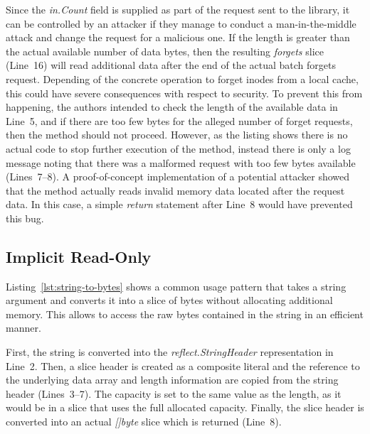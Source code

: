 Since the \textit{in.Count} field is supplied as part of the request sent to the library, it can be controlled by an
attacker if they manage to conduct a man-in-the-middle attack and change the request for a malicious
one.
If the length is greater than the actual available number of data bytes, then the resulting \textit{forgets} slice
(Line~16) will read additional data after the end of the actual batch forgets request.
Depending of the concrete operation to forget inodes from a local cache, this could have severe consequences with
respect to security.
To prevent this from happening, the authors intended to check the length of the available data in Line~5, and if there
are too few bytes for the alleged number of forget requests, then the method should not proceed.
However, as the listing shows there is no actual code to stop further execution of the method, instead there is only a
log message noting that there was a malformed request with too few bytes available (Lines~7--8).
A proof-of-concept implementation of a potential attacker showed that the method actually reads invalid memory data
located after the request data.
In this case, a simple \textit{return} statement after Line~8 would have prevented this bug.



\subsection{Implicit Read-Only}\label{subsec:unsafe-security-problems:slice-casts:read-only}

Listing~\ref{lst:string-to-bytes} shows a common \unsafe{} usage pattern that takes a string argument and converts it
into a slice of bytes without allocating additional memory.
This allows to access the raw bytes contained in the string in an efficient manner.



First, the string is converted into the \textit{reflect.StringHeader} representation in Line~2.
Then, a slice header is created as a composite literal and the reference to the underlying data array and length
information are copied from the string header (Lines~3--7).
The capacity is set to the same value as the length, as it would be in a slice that uses the full allocated capacity.
Finally, the slice header is converted into an actual \textit{[]byte} slice which is returned (Line~8).

